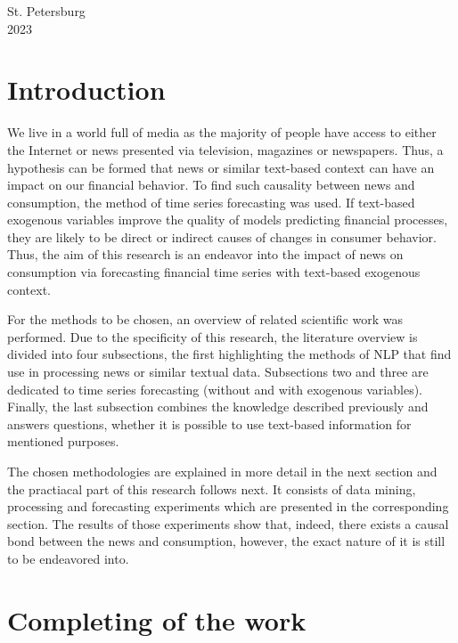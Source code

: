 \documentclass[13pt, a4paper]{article}
\begin{document}
\begin{center}
St. Petersburg \\
2023 \\
\end{center}

\newpage

\tableofcontents

\newpage

\section*{Introduction}

We live in a world full of media as the majority of people have access to either the Internet or news presented via television, magazines or newspapers. Thus, a hypothesis can be formed that news or similar text-based context can have an impact on our financial behavior. To find such causality between news and consumption, the method of time series forecasting was used. If text-based exogenous variables improve the quality of models predicting financial processes, they are likely to be direct or indirect causes of changes in consumer behavior. Thus, the aim of this research is an endeavor into the impact of news on consumption via forecasting financial time series with text-based exogenous context.

For the methods to be chosen, an overview of related scientific work was performed. Due to the specificity of this research, the literature overview is divided into four subsections, the first highlighting the methods of NLP that find use in processing news or similar textual data. Subsections two and three are dedicated to time series forecasting (without and with exogenous variables). Finally, the last subsection combines the knowledge described previously and answers questions, whether it is possible to use text-based information for mentioned purposes.

The chosen methodologies are explained in more detail in the next section and the practiacal part of this research follows next. It consists of data mining, processing and forecasting experiments which are presented in the corresponding section. The results of those experiments show that, indeed, there exists a causal bond between the news and consumption, however, the exact nature of it is still to be endeavored into.

\section{Completing of the work}
\vspace{-3mm}
\end{document}
